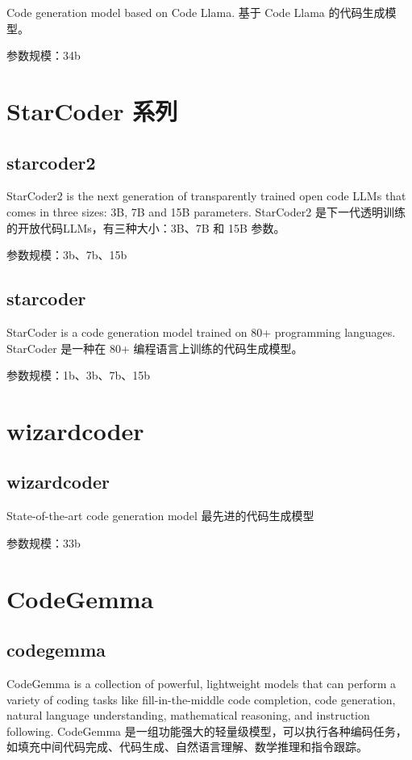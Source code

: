 \documentclass[12pt,UTF8]{ctexbook}
\begin{document}
Code generation model based on Code Llama.
基于 Code Llama 的代码生成模型。

参数规模：34b

\section{StarCoder 系列}

\subsection{starcoder2}

StarCoder2 is the next generation of transparently trained open code LLMs that comes in three sizes: 3B, 7B and 15B parameters.
StarCoder2 是下一代透明训练的开放代码LLMs，有三种大小：3B、7B 和 15B 参数。

参数规模：3b、7b、15b

\subsection{starcoder}

StarCoder is a code generation model trained on 80+ programming languages.
StarCoder 是一种在 80+ 编程语言上训练的代码生成模型。

参数规模：1b、3b、7b、15b

\section{wizardcoder}

\subsection{wizardcoder}

State-of-the-art code generation model
最先进的代码生成模型

参数规模：33b

\section{CodeGemma}

\subsection{codegemma}

CodeGemma is a collection of powerful, lightweight models that can perform a variety of coding tasks like fill-in-the-middle code completion, code generation, natural language understanding, mathematical reasoning, and instruction following.
CodeGemma 是一组功能强大的轻量级模型，可以执行各种编码任务，如填充中间代码完成、代码生成、自然语言理解、数学推理和指令跟踪。
\end{document}

